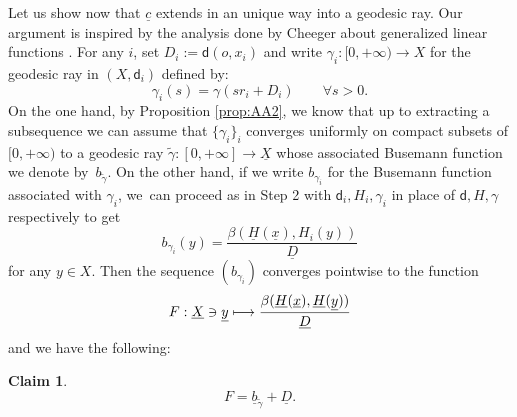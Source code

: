 \documentclass[JEP,XML,SOM,Unicode,published]{cedram}
\newcommand\mto{\mathchoice{\longmapsto}{\mapsto}{\mapsto}{\mapsto}}
\theoremstyle{plain}
\newtheorem{claim}[theorem]{Claim}
\theoremstyle{definition}
\newcommand{\dist}{\mathsf{d}}
\newcommand{\uX}{\underline{X}}
\newcommand{\ux}{\underline{x}}
\newcommand{\uc}{\underline{c}}
\newcommand{\uD}{\underline{D}}
\newcommand{\uH}{\underline{H}}
\newcommand{\uy}{\underline{y}}
\begin{document}
Let us show now that $\uc$ extends in an unique way into a geodesic ray. Our argument is inspired by the analysis done by Cheeger about generalized linear functions \cite[\S 8]{CheegerRademacher}. For any $i$, set $D_i:=\dist(o,x_i)$ and write $\gamma_i:[0,+\infty) \to X$ for the geodesic ray in $(X,\dist_i)$ defined by:
\[
\gamma_i(s) = \gamma(sr_i + D_i) \qquad \forall s>0.
\]
On the one hand, by Proposition \ref{prop:AA2}, we know that up to extracting a subsequence we can assume that $\{\gamma_i\}_i$ converges uniformly on compact subsets of $[0,+\infty)$ to a geodesic ray $\tilde{\gamma}:[0,+\infty] \to \uX$ whose associated Busemann function we denote by~$b_{\tilde{\gamma}}$. On the other hand, if we write $b_{\gamma_i}$ for the Busemann function associated with $\gamma_i$, we~can proceed as in Step 2 with $\dist_{i}, H_{i},\gamma_{i}$ in place of $\dist, H, \gamma$ respectively to get
\begin{equation}
b_{\gamma_{i}}(y) = \frac{\beta(\uH(\ux),H_{i}(y))}{\uD}
\end{equation}
for any $y \in X$. Then the sequence $(b_{\gamma_i})$ converges pointwise to the function
\[
F:\uX \ni \uy \mto \frac{\beta(\uH(\ux),\uH(\uy))}{\uD}
\]
and we have the following:

\skpt
\begin{claim}\mbox{}\vspace*{-1.2\baselineskip}
\begin{equation}\label{eq:uniqueness}
F=\underline{b}_{\tilde{\gamma}}+\uD.
\end{equation}
\end{claim}
\end{document}
